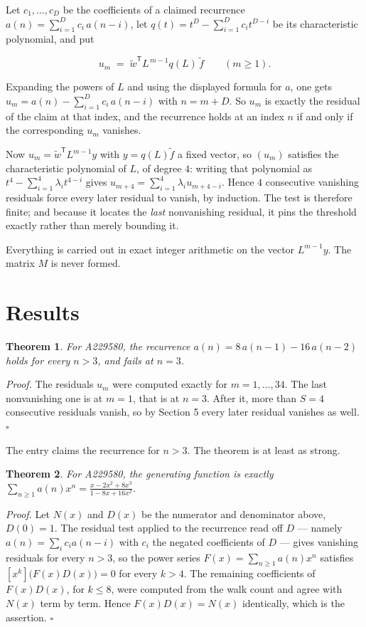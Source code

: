 \documentclass[11pt]{article}
\newtheorem{theorem}{Theorem}
\theoremstyle{definition}
\begin{document}
Let $c_1,\dots,c_D$ be the coefficients of a claimed recurrence $a(n) = \sum_{i=1}^{D} c_i\,a(n-i)$, let $q(t) = t^{D} - \sum_{i=1}^{D} c_i t^{D-i}$ be its characteristic polynomial, and put

\[u_m \;=\; \tilde w^{\mathsf T} L^{\,m-1} q(L)\,\tilde f \qquad (m \ge 1).\]

Expanding the powers of $L$ and using the displayed formula for $a$, one gets $u_m = a(n) - \sum_{i=1}^{D} c_i\,a(n-i)$ with $n = m + D$. So $u_m$ is exactly the residual of the claim at that index, and the recurrence holds at an index $n$ if and only if the corresponding $u_m$ vanishes.

Now $u_m = \tilde w^{\mathsf T} L^{m-1} y$ with $y = q(L)\tilde f$ a fixed vector, so $(u_m)$ satisfies the characteristic polynomial of $L$, of degree $4$: writing that polynomial as $t^{4} - \sum_{i=1}^{4} \lambda_i t^{4-i}$ gives $u_{m+4} = \sum_{i=1}^{4} \lambda_i u_{m+4-i}$. Hence $4$ consecutive vanishing residuals force every later residual to vanish, by induction. The test is therefore finite; and because it locates the {\itshape last} nonvanishing residual, it pins the threshold exactly rather than merely bounding it.

Everything is carried out in exact integer arithmetic on the vector $L^{m-1}y$. The matrix $M$ is never formed.

\section{Results}

\begin{theorem} For A229580, the recurrence $a(n) = 8\,a(n-1) - 16\,a(n-2)$ holds for every $n > 3$, and fails at $n = 3$.\end{theorem}

{\itshape Proof.} The residuals $u_m$ were computed exactly for $m = 1,\dots,34$. The last nonvanishing one is at $m = 1$, that is at $n = 3$. After it, more than $S = 4$ consecutive residuals vanish, so by Section 5 every later residual vanishes as well. $\square$

The entry claims the recurrence for $n > 3$. The theorem is at least as strong.

\begin{theorem} For A229580, the generating function is exactly $\sum_{n\ge 1} a(n)x^n = \frac{x - 2x^{2} + 8x^{3}}{1 - 8x + 16x^{2}}$.\end{theorem}

{\itshape Proof.} Let $N(x)$ and $D(x)$ be the numerator and denominator above, $D(0)=1$. The residual test applied to the recurrence read off $D$ --- namely $a(n) = \sum_i c_i a(n-i)$ with $c_i$ the negated coefficients of $D$ --- gives vanishing residuals for every $n > 3$, so the power series $F(x)=\sum_{n\ge 1}a(n)x^n$ satisfies $[x^k]\bigl(F(x)D(x)\bigr) = 0$ for every $k > 4$. The remaining coefficients of $F(x)D(x)$, for $k \le 8$, were computed from the walk count and agree with $N(x)$ term by term. Hence $F(x)D(x) = N(x)$ identically, which is the assertion. $\square$
\end{document}

